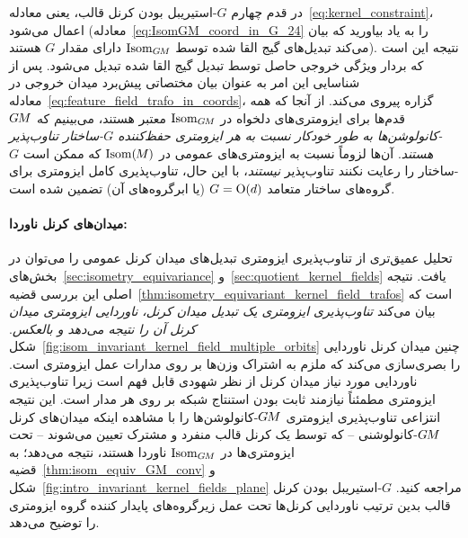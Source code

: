 در قدم چهارم $G$-استیریبل بودن کرنل قالب، یعنی معادله~\eqref{eq:kernel_constraint}، اعمال می‌شود (معادله~\eqref{eq:IsomGM_coord_in_G_24} را به یاد بیاورید که بیان می‌کند تبدیل‌های گیج القا شده توسط $\operatorname{Isom}_{G\mkern-1.4muM}$ دارای مقدار $G$ هستند).
نتیجه این است که بردار ویژگی خروجی حاصل توسط تبدیل گیج القا شده تبدیل می‌شود.
پس از شناسایی این امر به عنوان بیان مختصاتی پیش‌برد میدان خروجی در معادله~\eqref{eq:feature_field_trafo_in_coords}، گزاره پیروی می‌کند.
از آنجا که همه قدم‌ها برای ایزومتری‌های دلخواه در $\operatorname{Isom}_{G\mkern-1.4muM}$ معتبر هستند، می‌بینیم که \emph{$G\mkern-1.4muM$-کانولوشن‌ها به طور خودکار نسبت به هر ایزومتری حفظ‌کننده $G$-ساختار تناوب‌پذیر هستند}.
آن‌ها لزوماً نسبت به ایزومتری‌های عمومی در $\operatorname{Isom}(\mkern-1.5mu M \mkern-.5mu)$ که ممکن است $G$-ساختار را رعایت نکنند تناوب‌پذیر \emph{نیستند}، با این حال، تناوب‌پذیری کامل ایزومتری برای گروه‌های ساختار متعامد $G=\operatorname{O}(d)$ (یا ابرگروه‌های آن) تضمین شده است.



\paragraph{میدان‌های کرنل ناوردا:}
تحلیل عمیق‌تری از تناوب‌پذیری ایزومتری تبدیل‌های میدان کرنل عمومی را می‌توان در بخش‌های~\ref{sec:isometry_equivariance} و~\ref{sec:quotient_kernel_fields} یافت.
نتیجه اصلی این بررسی قضیه~\ref{thm:isometry_equivariant_kernel_field_trafos} است که بیان می‌کند \emph{تناوب‌پذیری ایزومتری یک تبدیل میدان کرنل، ناوردایی ایزومتری میدان کرنل آن را نتیجه می‌دهد و بالعکس}.
شکل~\ref{fig:isom_invariant_kernel_field_multiple_orbits} چنین میدان کرنل ناوردایی را بصری‌سازی می‌کند که ملزم به اشتراک وزن‌ها بر روی مدارات عمل ایزومتری است.
ناوردایی مورد نیاز میدان کرنل از نظر شهودی قابل فهم است زیرا تناوب‌پذیری ایزومتری مطمئناً نیازمند ثابت بودن استنتاج شبکه بر روی هر مدار است.
این نتیجه انتزاعی تناوب‌پذیری ایزومتری $G\mkern-1.4muM$-کانولوشن‌ها را با مشاهده اینکه میدان‌های کرنل $G\mkern-1.4muM$-کانولوشنی -- که توسط یک کرنل قالب منفرد و مشترک تعیین می‌شوند -- تحت ایزومتری‌ها در $\operatorname{Isom}_{G\mkern-1.4muM}$ ناوردا هستند، نتیجه می‌دهد؛ به قضیه~\ref{thm:isom_equiv_GM_conv} و شکل~\ref{fig:intro_invariant_kernel_fields_plane} مراجعه کنید.
$G$-استیریبل بودن کرنل قالب بدین ترتیب ناوردایی کرنل‌ها تحت عمل زیرگروه‌های پایدار کننده گروه ایزومتری را توضیح می‌دهد.



